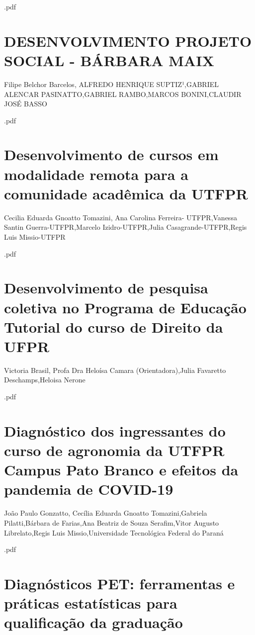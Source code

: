 

.pdf\section{DESENVOLVIMENTO PROJETO SOCIAL - BÁRBARA MAIX}

Filipe Belchor Barcelos, ALFREDO HENRIQUE SUPTIZ¹,GABRIEL ALENCAR PASINATTO,GABRIEL RAMBO,MARCOS BONINI,CLAUDIR JOSÉ BASSO



.pdf\section{Desenvolvimento de cursos em modalidade remota para a comunidade acadêmica da UTFPR }

Cecilia Eduarda Gnoatto Tomazini, Ana Carolina Ferreira- UTFPR,Vanessa Santin Guerra-UTFPR,Marcelo Izidro-UTFPR,Julia Casagrande-UTFPR,Regis Luis Missio-UTFPR



.pdf\section{Desenvolvimento de pesquisa coletiva no Programa de Educação Tutorial do curso de Direito da UFPR}

Victoria Brasil, Profa Dra Heloísa Camara (Orientadora),Julia Favaretto Deschamps,Heloisa Nerone



.pdf\section{Diagnóstico dos ingressantes do curso de agronomia da UTFPR Campus Pato Branco e efeitos da pandemia de COVID-19}

João Paulo Gonzatto, Cecília Eduarda Gnoatto Tomazini,Gabriela Pilatti,Bárbara de Farias,Ana Beatriz de Souza Serafim,Vitor Augusto Librelato,Regis Luis Missio,Universidade Tecnológica Federal do Paraná



.pdf\section{Diagnósticos PET: ferramentas e práticas estatísticas para qualificação da graduação}


